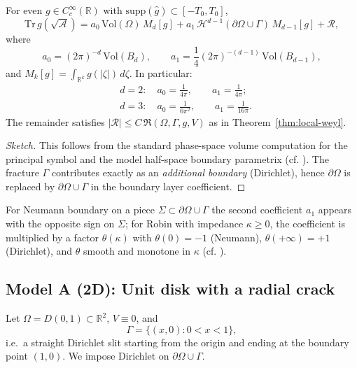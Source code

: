 \begin{lemma}
\label{lem:weyl-constants}
For even $g\in C_c^\infty(\mathbb{R})$ with $\mathrm{supp}(\widehat g)\subset[-T_0,T_0]$,
\[
\mathrm{Tr}\,g(\sqrt{\mathcal{A}})=
a_0\,\mathrm{Vol}(\Omega)\,M_d[g] + a_1\,\mathcal{H}^{d-1}(\partial\Omega\cup\Gamma)\,M_{d-1}[g] + \mathcal{R},
\]
where
\[
a_0=(2\pi)^{-d}\,\mathrm{Vol}(B_d),\qquad
a_1=\frac{1}{4}(2\pi)^{-(d-1)}\,\mathrm{Vol}(B_{d-1}),
\]
and
\(
M_k[g]=\int_{\mathbb{R}^k} g(|\zeta|)\,d\zeta.
\)
In particular:
\[
\begin{aligned}
& d=2:\quad a_0=\frac{1}{4\pi},\qquad a_1=\frac{1}{4\pi};\\
& d=3:\quad a_0=\frac{1}{6\pi^2},\qquad a_1=\frac{1}{16\pi}.
\end{aligned}
\]
The remainder satisfies $|\mathcal{R}|\le C\,\mathfrak{R}(\Omega,\Gamma,g,V)$ as in Theorem~\ref{thm:local-weyl}.
\end{lemma}

\begin{proof}[Sketch]
This follows from the standard phase-space volume computation for the principal symbol
and the model half-space boundary parametrix (cf. \cite{SafarovVassiliev1997,Ivrii1980}).
The fracture $\Gamma$ contributes exactly as an \emph{additional boundary} (Dirichlet),
hence $\partial\Omega$ is replaced by $\partial\Omega\cup\Gamma$ in the boundary layer coefficient.
\end{proof}

\begin{remark}
For Neumann boundary on a piece $\Sigma\subset\partial\Omega\cup\Gamma$ the second coefficient $a_1$
appears with the opposite sign on $\Sigma$; for Robin with impedance $\kappa\ge 0$, the coefficient
is multiplied by a factor $\theta(\kappa)$ with $\theta(0)=-1$ (Neumann), $\theta(+\infty)=+1$ (Dirichlet),
and $\theta$ smooth and monotone in $\kappa$ (cf. \cite{SafarovVassiliev1997}).
\end{remark}

\subsection{Model A (2D): Unit disk with a radial crack}
\label{sub:model-disk-crack}

Let $\Omega=D(0,1)\subset\mathbb{R}^2$, $V\equiv 0$, and
\[
\Gamma=\{(x,0):0< x< 1\},
\]
i.e.\ a straight Dirichlet slit starting from the origin and ending at the boundary point $(1,0)$.
We impose Dirichlet on $\partial\Omega\cup\Gamma$.


